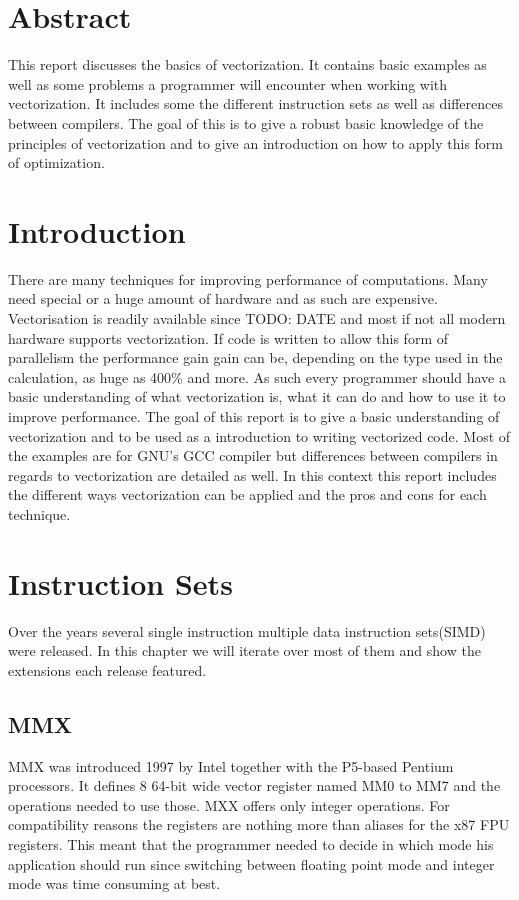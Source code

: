 \documentclass[
	12pt,
	a4paper,
	BCOR10mm,
	DIV14,
	headsepline,
	usegeometry,
]{scrreprt}
\begin{document}
\restoregeometry

\chapter*{Abstract}

\thispagestyle{empty}

This report discusses the basics of vectorization. It contains basic examples as well as some problems a programmer will encounter when working with
vectorization. It includes some the different instruction sets as well as differences between
compilers. The goal of this is to give a robust basic knowledge of the principles of
vectorization and to give an introduction on how to apply this form of optimization.
\tableofcontents

\chapter{Introduction}
There are many techniques for improving performance of computations. Many need special or a huge
amount of hardware and as such are expensive. Vectorisation is readily available since TODO: DATE
and most if not all modern hardware supports vectorization. If code is written to allow this form
of parallelism the performance gain gain can be, depending on the type used in the calculation, as
huge as 400\% and more. As such every programmer should have a
basic understanding of what vectorization is, what it can do and how to use it to
improve performance. The goal of this report is to give a basic understanding of vectorization and
to be used as a introduction to writing vectorized code. Most of the examples are for GNU's GCC
compiler but differences between compilers in regards to vectorization are detailed as well.
In this context this report includes the different ways vectorization can be applied and the pros
and cons for each technique.

\chapter{Instruction Sets}
Over the years several single instruction multiple data instruction sets(SIMD) were released.
In this chapter we will iterate over most of them and show the extensions each release featured.
    \section{MMX}
    MMX was introduced 1997 by Intel together with the P5-based Pentium processors. It defines 8
    64-bit wide vector register named MM0 to MM7 and the operations needed to use those. MXX offers
    only integer operations.
    For compatibility reasons the registers are nothing more than aliases for the x87 FPU
    registers.
    This meant that the programmer needed to
    decide in which mode his application should run since switching between floating point
    mode and integer mode was time consuming at best. \cite{MMX_WIK}
\end{document}
